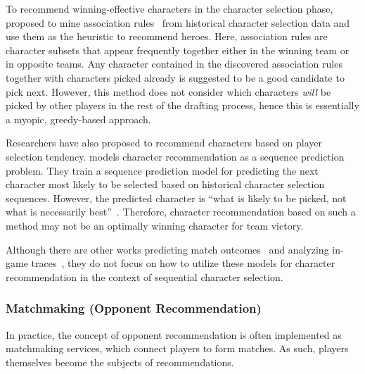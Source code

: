To recommend winning-effective characters in the character selection phase, \textcite{hanke2017reco} proposed to mine association rules~\citep{agrawal1994fast} from historical character selection data and use them as the heuristic to recommend heroes. Here, association rules are character subsets that appear frequently together either in the winning team or in opposite teams. Any character contained in the discovered association rules together with characters picked already is suggested to be a good candidate to pick next. However, this method does not consider which characters \textit{will} be picked by other players in the rest of the drafting process, hence this is essentially a myopic, greedy-based approach.


Researchers have also proposed to recommend characters based on player selection tendency. \textcite{summerville2017reco} models character recommendation as a sequence prediction problem. They train a sequence prediction model for predicting the next character most likely to be selected based on historical character selection sequences. However, the predicted character is ``what is
likely to be picked, not what is necessarily best''~\citep{summerville2017reco}. Therefore, character recommendation based on such a method may not be an optimally winning character for team victory.

Although there are other works predicting match outcomes~\citep{Yang:identifying,Semenov2016,makarov2017predicting} and analyzing in-game traces~\citep{cavadenti2016did}, they do not focus on how to utilize these models for character recommendation in the context of sequential character selection.


\subsubsection{Matchmaking (Opponent Recommendation)}


In practice, the concept of opponent recommendation is often implemented as matchmaking services, which connect players to form matches. As such, players themselves become the subjects of recommendations.



